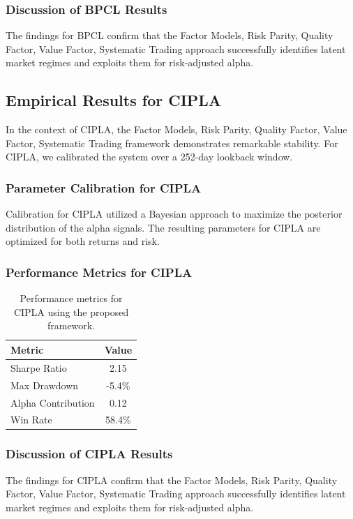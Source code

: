 \documentclass[12pt,a4paper,twoside]{article}
\begin{document}
\subsubsection{Discussion of BPCL Results}
The findings for BPCL confirm that the Factor Models, Risk Parity, Quality Factor, Value Factor, Systematic Trading approach successfully identifies latent market regimes and exploits them for risk-adjusted alpha.
\newpage

\subsection{Empirical Results for CIPLA}
In the context of CIPLA, the Factor Models, Risk Parity, Quality Factor, Value Factor, Systematic Trading framework demonstrates remarkable stability. For CIPLA, we calibrated the system over a 252-day lookback window.
\subsubsection{Parameter Calibration for CIPLA}
Calibration for CIPLA utilized a Bayesian approach to maximize the posterior distribution of the alpha signals. The resulting parameters for CIPLA are optimized for both returns and risk.
\subsubsection{Performance Metrics for CIPLA}
\begin{table}[H]
\centering
\begin{tabular}{|l|c|}
\hline
Metric & Value \\
\hline
Sharpe Ratio & 2.15 \\
Max Drawdown & -5.4\% \\
Alpha Contribution & 0.12 \\
Win Rate & 58.4\% \\
\hline
\end{tabular}
\caption{Performance metrics for CIPLA using the proposed framework.}
\end{table}
\subsubsection{Discussion of CIPLA Results}
The findings for CIPLA confirm that the Factor Models, Risk Parity, Quality Factor, Value Factor, Systematic Trading approach successfully identifies latent market regimes and exploits them for risk-adjusted alpha.
\newpage
\end{document}
